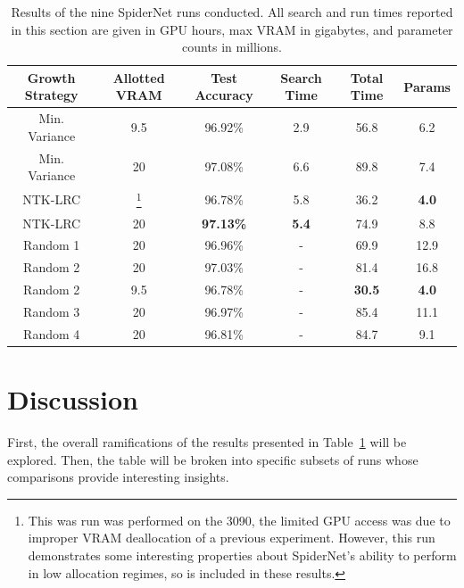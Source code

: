 \begin{table}[ht!]
\begin{center}
\begin{minipage}{\textwidth}
    \renewcommand{\thempfootnote}{\fnsymbol{mpfootnote}}
\begin{tabular}{c|c|c|c|c|c}
    Growth Strategy & Allotted VRAM & Test Accuracy    & Search Time  & Total Time & Params \\
    \hline
    Min. Variance   & 9.5      & 96.92\%          & 2.9          & 56.8       & 6.2    \\
    Min. Variance   & 20       & 97.08\%          & 6.6          & 89.8       & 7.4    \\
    NTK-LRC & \;\;6.5\footnote{This was run was performed on the 3090, the limited GPU access was due to improper VRAM deallocation of a previous experiment. However, this run demonstrates
    some interesting properties about SpiderNet's ability to perform in low allocation regimes, so is included in these results.}
                               & 96.78\%          & 5.8          & 36.2      & \textbf{4.0} \\
    NTK-LRC         & 20       & \textbf{97.13\%} & \textbf{5.4} & 74.9       & 8.8    \\
    \hline
    Random 1        & 20       & 96.96\%          & -            & 69.9       & 12.9   \\
    Random 2        & 20       & 97.03\%          & -            & 81.4       & 16.8 \\
    Random 2        & 9.5      & 96.78\%          & -            & \textbf{30.5}       & \textbf{4.0}   \\
    Random 3        & 20       & 96.97\%          & -            & 85.4       & 11.1   \\
    Random 4        & 20       & 96.81\%          & -            & 84.7       & 9.1   \\
\end{tabular}
\end{minipage}
\end{center}
\caption[Results of the nine SpiderNet runs conducted]{Results of the nine SpiderNet runs conducted. All search and run times reported in this section are given in GPU hours, max
VRAM in gigabytes, and parameter counts in millions.}
\label{tab:spider_all_results}
\end{table}

\section{Discussion}\label{sect:spider_discussion}
First, the overall ramifications of the results presented in Table~\ref{tab:spider_all_results} will be explored. Then,
 the table will be broken into specific subsets of runs whose comparisons provide interesting insights.

